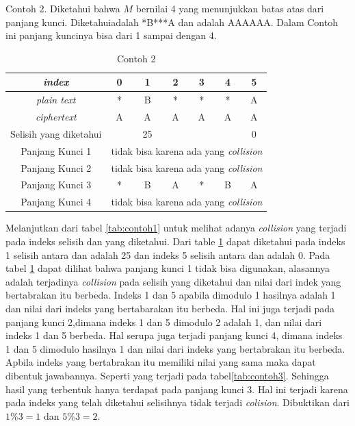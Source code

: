 	 Contoh 2. Diketahui bahwa $M$ bernilai 4 yang menunjukkan batas atas dari panjang kunci. Diketahui\plaintext adalah *B***A dan \ciphertext adalah AAAAAA. Dalam Contoh ini panjang kuncinya bisa dari 1 sampai dengan 4. 
	 \begin{table}[H]
	 	\centering
	 	\begin{tabular}{|c|c|c|c|c|c|c|}\hline
		\textit{index}&0&1&2&3&4&5\\ \hline
	 	\textit{plain text}&*&B&*&*&*&A\\ \hline
	 	\textit{ciphertext}&A&A&A&A&A&A\\ \hline
	 	Selisih yang diketahui& &25& & & &0\\ \hline
	 	Panjang Kunci 1 & \multicolumn{6}{c|}{tidak bisa karena ada yang \textit{collision}}\\ \hline
	 	Panjang Kunci 2 & \multicolumn{6}{c|}{tidak bisa karena ada yang \textit{collision}}\\ \hline
	 	Panjang Kunci 3 &*&B&A&*&B&A \\ \hline
	 	Panjang Kunci 4 & \multicolumn{6}{c|}{tidak bisa karena ada yang \textit{collision}}\\ \hline
	 	\end{tabular}
	 	\caption{Contoh 2}
	 	\label{tab:contoh2}
	\end{table}
	
	Melanjutkan dari tabel \ref{tab:contoh1} untuk melihat adanya \textit{collision} yang terjadi pada indeks selisih \plaintext dan \ciphertext yang diketahui. Dari table \ref{tab:contoh2} dapat diketahui pada indeks 1 selisih antara \plaintext dan \ciphertext adalah 25 dan indeks 5 selisih antara \plaintext dan \ciphertext adalah 0. Pada tabel \ref{tab:contoh2} dapat dilihat bahwa panjang kunci 1 tidak bisa digunakan, alasannya adalah terjadinya \textit{collision} pada selisih yang diketahui dan nilai dari indek yang bertabrakan itu berbeda. Indeks 1 dan 5 apabila dimodulo 1 hasilnya adalah 1 dan nilai dari indeks yang bertabarakan itu berbeda. Hal ini juga terjadi pada panjang kunci 2,dimana indeks 1 dan 5 dimodulo 2 adalah 1, dan nilai dari indeks 1 dan 5 berbeda. Hal serupa juga terjadi panjang kunci 4, dimana indeks 1 dan 5 dimodulo hasilnya 1 dan nilai dari indeks yang bertabrakan itu berbeda. Apbila indeks yang bertabrakan itu memiliki nilai yang sama maka dapat dibentuk jawabannya. Seperti yang terjadi pada tabel\ref{tab:contoh3}. Sehingga hasil yang terbentuk hanya terdapat pada panjang kunci 3. Hal ini terjadi karena pada indeks yang telah diketahui selisihnya tidak terjadi \textit{colision}. Dibuktikan dari $1\%3=1$ dan $5\%3=2$. 
	
